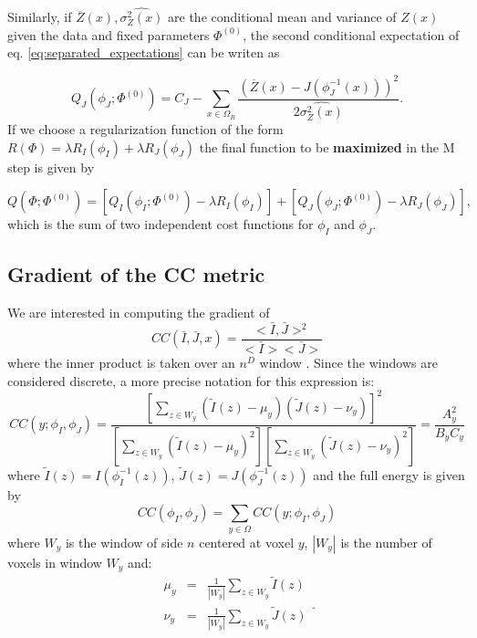 Similarly, if $\overline{Z}(x), \widehat{\sigma^{2}_{Z}(x)}$ are the conditional mean and variance of $Z(x)$ given the data
and fixed parameters $\Phi^{(0)}$, the second conditional expectation of eq. \eqref{eq:separated_expectations} can be writen as

\begin{equation}
    Q_{J}(\phi_{J}; \Phi^{(0)}) = C_{J} - \sum_{x\in\Omega_{R}}\frac{(\overline{Z}(x) - J(\phi^{-1}_{J}(x)))^{2}}{2\widehat{\sigma^{2}_{Z}(x)}}.
\end{equation}
If we choose a regularization function of the form $R(\Phi) = \lambda R_{I}(\phi_{I}) + \lambda R_{J}(\phi_{J})$ the final function to be \textbf{maximized} in the M step is given by

\begin{equation}
    Q(\Phi; \Phi^{(0)}) = \left[Q_{I}(\phi_{I}; \Phi^{(0)}) - \lambda R_{I}(\phi_{I})\right] + \left[Q_{J}(\phi_{J}; \Phi^{(0)}) - \lambda R_{J}(\phi_{J})\right],
\end{equation}
which is the sum of two independent cost functions for $\phi_{I}$ and $\phi_{J}$.

\subsection{Gradient of the CC metric}\label{ap:CC_gradient}
We are interested in computing the gradient of
\begin{equation}
    CC(\bar{I}, \bar{J}, x) = \frac{<\bar{I}, \bar{J}>^{2}}{<\bar{I}><\bar{J}>}
\end{equation}
where the inner product is taken over an $n^{D}$ window \citep[see][eq. 4]{Avants2008}. Since the windows are considered discrete, a more precise notation
for this expression is:
\begin{equation}\label{eq:CC_definition}
    CC(y;\phi_{I}, \phi_{J}) = \frac{\left[\sum_{z\in W_{y}} \left(\tilde{I}(z) - \mu_{y}\right)\left(\tilde{J}(z) - \nu_{y}\right)\right]^{2}}
    {\left[\sum_{z \in W_{y}}\left(\tilde{I}(z) - \mu_{y}\right)^{2}\right] \left[\sum_{z \in W_{y}}\left(\tilde{J}(z) - \nu_{y}\right)^{2}\right]} = \frac{A_{y}^{2}}{B_{y}C_{y}}
\end{equation}
where $\tilde{I}(z) = I(\phi_{I}^{-1}(z))$, $\tilde{J}(z) = J(\phi_{J}^{-1}(z))$ and the full energy is given by
\begin{equation}
    CC(\phi_{I}, \phi_{J}) = \sum_{y\in\Omega} CC(y; \phi_{I}, \phi_{J})
\end{equation}
where $W_{y}$ is the window of side $n$ centered at voxel $y$, $|W_{y}|$ is the number of voxels in window $W_{y}$ and:
\begin{equation}
    \begin{array}{lll}
        \mu_{y} &=& \frac{1}{|W_{y}|}\sum_{z \in W_{y}}\tilde{I}(z)\\[+2mm]
        \nu_{y} &=& \frac{1}{|W_{y}|}\sum_{z \in W_{y}}\tilde{J}(z)\\
    \end{array}.
\end{equation}

